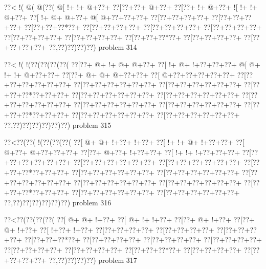 \vbox{\vbox{\goo
\0??<\- !(\- @(\- @(\0??(
\- @[\- !+\- !+\- @+\0??+
\0??[\0??+\0??+\- @+\0??+
\0??[\0??+\- !+\- @+\0??+
\- ![\- !+\- !+\- @+\0??+
\0??[\- !+\- @+\- @+\0??+
\- @[\- @+\0??+\0??+\0??+
\0??[\0??+\0??+\0??+\0??+
\0??[\0??+\0??+\0??+\0??+
\0??[\0??+\0??+\0??*\0??+
\0??[\0??+\0??+\0??+\0??+
\0??[\0??+\0??+\0??+\0??+
\0??[\0??+\0??+\0??+\0??+
\0??[\0??+\0??+\0??+\0??+
\0??[\0??+\0??+\0??+\0??+
\0??[\0??+\0??+\0??*\0??+
\0??[\0??+\0??+\0??+\0??+
\0??[\0??+\0??+\0??+\0??+
\0??,\0??)\0??)\0??)\0??)
}
\hfil problem 314\hfil\break
}

\vbox{\vbox{\goo
\0??<\- !(\- !(\0??(\0??(\0??(\0??(
\0??[\0??+\- @+\- !+\- @+\- @+\0??+
\0??[\- !+\- @+\- !+\0??+\0??+\0??+
\- @[\- @+\- !+\- !+\- @+\0??+\0??+
\0??[\0??+\- @+\- @+\- @+\0??+\0??+
\0??[\- @+\0??+\0??+\0??+\0??+\0??+
\0??[\0??+\0??+\0??+\0??+\0??+\0??+
\0??[\0??+\0??+\0??+\0??+\0??+\0??+
\0??[\0??+\0??+\0??+\0??+\0??+\0??+
\0??[\0??+\0??+\0??*\0??+\0??+\0??+
\0??[\0??+\0??+\0??+\0??+\0??+\0??+
\0??[\0??+\0??+\0??+\0??+\0??+\0??+
\0??[\0??+\0??+\0??+\0??+\0??+\0??+
\0??[\0??+\0??+\0??+\0??+\0??+\0??+
\0??[\0??+\0??+\0??+\0??+\0??+\0??+
\0??[\0??+\0??+\0??*\0??+\0??+\0??+
\0??[\0??+\0??+\0??+\0??+\0??+\0??+
\0??[\0??+\0??+\0??+\0??+\0??+\0??+
\0??,\0??)\0??)\0??)\0??)\0??)\0??)
}
\hfil problem 315\hfil\break
}

\vbox{\vbox{\goo
\0??<\0??(\0??(\- !(\0??(\0??(\0??(
\0??[\- @+\- @+\- !+\0??+\- !+\0??+
\0??[\- !+\- !+\- @+\- !+\0??+\0??+
\0??[\- @+\0??+\- @+\0??+\0??+\0??+
\0??[\0??+\- @+\0??+\- !+\0??+\0??+
\0??[\- !+\- !+\- !+\0??+\0??+\0??+
\0??[\0??+\0??+\0??+\0??+\0??+\0??+
\0??[\0??+\0??+\0??+\0??+\0??+\0??+
\0??[\0??+\0??+\0??+\0??+\0??+\0??+
\0??[\0??+\0??+\0??*\0??+\0??+\0??+
\0??[\0??+\0??+\0??+\0??+\0??+\0??+
\0??[\0??+\0??+\0??+\0??+\0??+\0??+
\0??[\0??+\0??+\0??+\0??+\0??+\0??+
\0??[\0??+\0??+\0??+\0??+\0??+\0??+
\0??[\0??+\0??+\0??+\0??+\0??+\0??+
\0??[\0??+\0??+\0??*\0??+\0??+\0??+
\0??[\0??+\0??+\0??+\0??+\0??+\0??+
\0??[\0??+\0??+\0??+\0??+\0??+\0??+
\0??,\0??)\0??)\0??)\0??)\0??)\0??)
}
\hfil problem 316\hfil\break
}

\vbox{\vbox{\goo
\0??<\0??(\0??(\0??(\0??(
\0??[\- @+\- @+\- !+\0??+
\0??[\- @+\- !+\- !+\0??+
\0??[\0??+\- @+\- !+\0??+
\0??[\0??+\- @+\- !+\0??+
\0??[\- !+\0??+\- !+\0??+
\0??[\0??+\0??+\0??+\0??+
\0??[\0??+\0??+\0??+\0??+
\0??[\0??+\0??+\0??+\0??+
\0??[\0??+\0??+\0??*\0??+
\0??[\0??+\0??+\0??+\0??+
\0??[\0??+\0??+\0??+\0??+
\0??[\0??+\0??+\0??+\0??+
\0??[\0??+\0??+\0??+\0??+
\0??[\0??+\0??+\0??+\0??+
\0??[\0??+\0??+\0??*\0??+
\0??[\0??+\0??+\0??+\0??+
\0??[\0??+\0??+\0??+\0??+
\0??,\0??)\0??)\0??)\0??)
}
\hfil problem 317\hfil\break
}

